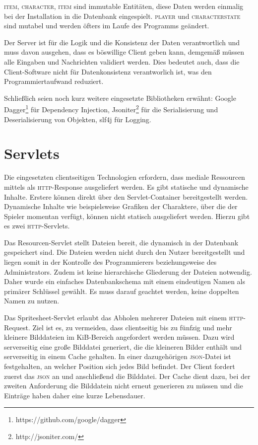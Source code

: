 \documentclass[ngerman,11pt]{report}
\begin{document}
\textsc{item}, \textsc{character}, \textsc{item} sind immutable Entitäten, diese Daten
werden einmalig bei der Installation in die Datenbank eingespielt. \textsc{player} und
\textsc{characterstate} sind mutabel und werden öfters im Laufe des Programms geändert.

Der Server ist für die Logik und die Konsistenz der Daten verantwortlich und muss davon
ausgehen, dass es böswillige Client geben kann, demgemäß müssen alle Eingaben und Nachrichten
validiert werden. Dies bedeutet auch, dass die Client-Software nicht für Datenkonsistenz
verantworlich ist, was den Programmiertaufwand reduziert.

Schließlich seien noch kurz weitere eingesetzte Bibliotheken erwähnt: Google
Dagger\footnote{https://github.com/google/dagger} für Dependency Injection,
Jsoniter\footnote{http://jsoniter.com/} für die Serialisierung und
Deserialisierung von Objekten, slf4j für Logging.

\section{Servlets}

Die eingesetzten clientseitigen Technologien erfordern, dass mediale Ressourcen mittels
als \textsc{http}-Response ausgeliefert werden. Es gibt statische und dynamische Inhalte.
Erstere können direkt über den Servlet-Container bereitgestellt werden. Dynamische Inhalte
wie beispielsweise Grafiken der Charaktere, über die der Spieler momentan verfügt, können
nicht statisch ausgeliefert werden. Hierzu gibt es zwei \textsc{http}-Servlets.

Das Resourcen-Servlet stellt Dateien bereit, die dynamisch in der Datenbank gespeichert sind.
Die Dateien werden nicht durch den Nutzer bereitgestellt und liegen somit in der Kontrolle des
Programmierers beziehungsweise des Administrators. Zudem ist keine hierarchische Gliederung
der Dateien notwendig. Daher wurde ein einfaches Datenbankschema mit einem eindeutigen Namen
als primärer Schlüssel gewählt. Es muss darauf geachtet werden, keine doppelten Namen zu nutzen.

Das Spritesheet-Servlet erlaubt das Abholen mehrerer Dateien mit einem \textsc{http}-Request.
Ziel ist es, zu vermeiden, dass clientseitig bis zu fünfzig und mehr kleinere Bilddateien im
KiB-Bereich angefordert werden müssen. Dazu wird serverseitig eine große Bilddatei generiert,
die die kleineren Bilder enthält und serverseitig in einem Cache gehalten.
In einer dazugehörigen \textsc{json}-Datei ist festgehalten, an welcher Position sich jedes Bild befindet. Der Client fordert zuerst das \textsc{json} an und anschließend die Bilddatei. Der Cache
dient dazu, bei der zweiten Anforderung die Bilddatein nicht erneut generieren zu müssen und die
Einträge haben daher eine kurze Lebensdauer.
\end{document}
